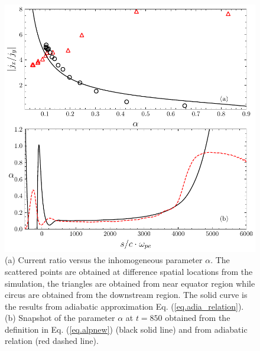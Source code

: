 \begin{figure}
    \centering
    \includegraphics[scale=0.5]{img/alpha.pdf}
    \caption{(a) Current ratio versus the inhomogeneous parameter $\alpha$. The scattered points are obtained at difference spatial locations from the simulation, the triangles are obtained from near equator region while circus are obtained from the downstream region. 
    The solid curve is the results from adiabatic approximation Eq. (\ref{eq.adia_relation}). 
    (b) Snapshot  of the parameter $\alpha$ at $t = 850$ obtained  from the definition in Eq. (\ref{eq.alpnew}) (black solid line) and  from adiabatic relation (red dashed line).
    }
    \label{fig.adiabatic}
\end{figure}


